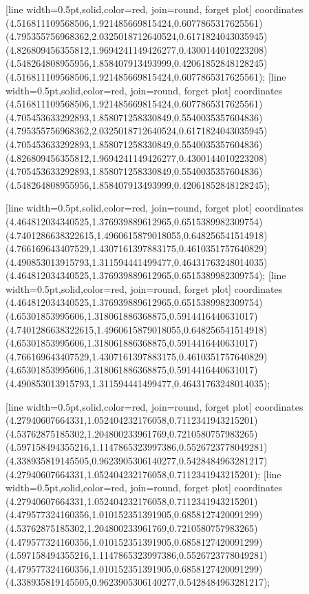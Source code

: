[line width=0.5pt,solid,color=red, join=round, forget plot] coordinates {(4.516811109568506,1.921485669815424,0.6077865317625561) (4.795355756968362,2.0325018712640524,0.6171824043035945) (4.826809456355812,1.9694241149426277,0.4300144010223208) (4.548264808955956,1.858407913493999,0.42061852848128245) (4.516811109568506,1.921485669815424,0.6077865317625561)};
[line width=0.5pt,solid,color=red, join=round, forget plot] coordinates {(4.516811109568506,1.921485669815424,0.6077865317625561) (4.705453633292893,1.858071258330849,0.5540035357604836) (4.795355756968362,2.0325018712640524,0.6171824043035945) (4.705453633292893,1.858071258330849,0.5540035357604836) (4.826809456355812,1.9694241149426277,0.4300144010223208) (4.705453633292893,1.858071258330849,0.5540035357604836) (4.548264808955956,1.858407913493999,0.42061852848128245)};

[line width=0.5pt,solid,color=red, join=round, forget plot] coordinates {(4.464812034340525,1.376939889612965,0.6515389982309754) (4.7401286638322615,1.4960615879018055,0.648256541514918) (4.766169643407529,1.4307161397883175,0.4610351757640829) (4.490853013915793,1.311594441499477,0.46431763248014035) (4.464812034340525,1.376939889612965,0.6515389982309754)};
[line width=0.5pt,solid,color=red, join=round, forget plot] coordinates {(4.464812034340525,1.376939889612965,0.6515389982309754) (4.65301853995606,1.318061886368875,0.5914416440631017) (4.7401286638322615,1.4960615879018055,0.648256541514918) (4.65301853995606,1.318061886368875,0.5914416440631017) (4.766169643407529,1.4307161397883175,0.4610351757640829) (4.65301853995606,1.318061886368875,0.5914416440631017) (4.490853013915793,1.311594441499477,0.46431763248014035)};

[line width=0.5pt,solid,color=red, join=round, forget plot] coordinates {(4.27940607664331,1.052404232176058,0.7112341943215201) (4.53762875185302,1.204800233961769,0.7210580757983265) (4.597158494355216,1.1147865323997386,0.5526723778049281) (4.338935819145505,0.9623905306140277,0.5428484963281217) (4.27940607664331,1.052404232176058,0.7112341943215201)};
[line width=0.5pt,solid,color=red, join=round, forget plot] coordinates {(4.27940607664331,1.052404232176058,0.7112341943215201) (4.479577324160356,1.010152351391905,0.6858127420091299) (4.53762875185302,1.204800233961769,0.7210580757983265) (4.479577324160356,1.010152351391905,0.6858127420091299) (4.597158494355216,1.1147865323997386,0.5526723778049281) (4.479577324160356,1.010152351391905,0.6858127420091299) (4.338935819145505,0.9623905306140277,0.5428484963281217)};

